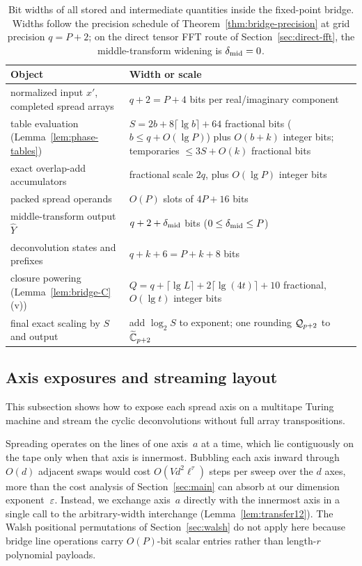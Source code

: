 \begin{table}[ht]
\centering
\small
\caption{Bit widths of all stored and intermediate quantities inside the fixed-point bridge. Widths follow the precision
schedule of Theorem~\ref{thm:bridge-precision} at grid precision $q=P+2$; on the direct tensor FFT route of
Section~\ref{sec:direct-fft}, the middle-transform widening is $\delta_{\rm mid}=0$.}\label{tab:widths}
\begin{tabular}{@{}>{\raggedright}p{}>{\raggedright\arraybackslash}p{}@{}}
\toprule
Object & Width or scale\\
\midrule
normalized input $x'$, completed spread arrays & $q+2=P+4$ bits per real/imaginary component\\
table evaluation (Lemma~\ref{lem:phase-tables}) & $S=2b+8\lceil\lg b\rceil+64$ fractional bits ($b\le q+O(\lg P)$) plus $O(b+k)$ integer bits; temporaries $\le 3S+O(k)$ fractional bits\\
exact overlap-add accumulators & fractional scale $2q$, plus $O(\lg P)$ integer bits\\
packed spread operands & $O(P)$ slots of $4P+16$ bits\\
middle-transform output $\widehat Y$ & $q+2+\delta_{\rm mid}$ bits ($0\le\delta_{\rm mid}\le P$)\\
deconvolution states and prefixes & $q+k+6=P+k+8$ bits\\
closure powering (Lemma~\ref{lem:bridge-C}(v)) & $Q=q+\lceil\lg L\rceil+2\lceil\lg(4t)\rceil+10$ fractional, $O(\lg t)$ integer bits\\
final exact scaling by $S$ and output & add $\log_2 S$ to exponent; one rounding $\mathcal{Q}_{p+2}$ to $\widetilde{\mathbb{C}}_{p+2}$\\
\bottomrule
\end{tabular}
\end{table}

\subsection{Axis exposures and streaming layout}\label{sec:bridge-D}

This subsection shows how to expose each spread axis on a multitape Turing machine and stream the cyclic deconvolutions
without full array transpositions.

Spreading operates on the lines of one axis~$a$ at a time, which lie contiguously on the tape only when that axis is
innermost. Bubbling each axis inward through $O(d)$ adjacent swaps would cost $O(Vd^2\ell^\tau)$ steps per sweep over
the $d$ axes, more than the cost analysis of Section~\ref{sec:main} can absorb at our dimension exponent~$\varepsilon$.
Instead, we exchange axis~$a$ directly with the innermost axis in a single call to the arbitrary-width interchange
(Lemma~\ref{lem:transfer12}). The Walsh positional
permutations of Section~\ref{sec:walsh} do not apply here because bridge line operations carry $O(P)$-bit scalar entries
rather than length-$r$ polynomial payloads.

